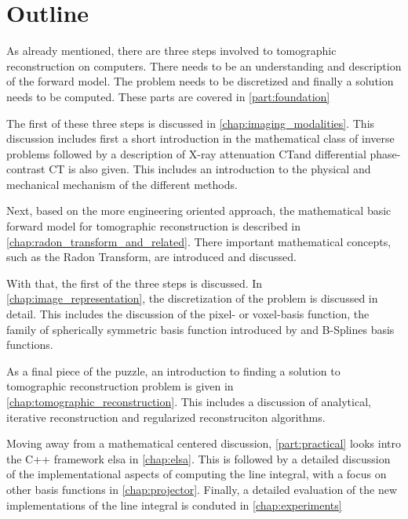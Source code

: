 
\section{Outline}\label{sec:outline}

As already mentioned, there are three steps involved to tomographic reconstruction on computers.
There needs to be an understanding and description of the forward model. The problem needs to be
discretized and finally a solution needs to be computed. These parts are covered in
\autoref{part:foundation}

The first of these three steps is discussed in \autoref{chap:imaging_modalities}. This discussion
includes first a short introduction in the mathematical class of inverse problems followed by a
description of X-ray attenuation CT\@ and differential phase-contrast CT is also given. This
includes an introduction to the physical and mechanical mechanism of the different methods.

Next, based on the more engineering oriented approach, the mathematical basic forward model for
tomographic reconstruction is described in \autoref{chap:radon_transform_and_related}. There
important mathematical concepts, such as the Radon Transform, are introduced and discussed.

With that, the first of the three steps is discussed. In \autoref{chap:image_representation}, the
discretization of the problem is discussed in detail. This includes the discussion of the pixel- or
voxel-basis function, the family of spherically symmetric basis function introduced by
\citeauthor*{lewitt_multidimensional_1990} and B-Splines basis functions.

As a final piece of the puzzle, an introduction to finding a solution to tomographic reconstruction
problem is given in \autoref{chap:tomographic_reconstruction}. This includes a discussion of
analytical, iterative reconstruction and regularized reconstruciton algorithms.

Moving away from a mathematical centered discussion, \autoref{part:practical} looks intro the C++
framework elsa in \autoref{chap:elsa}. This is followed by a detailed discussion of the
implementational aspects of computing the line integral, with a focus on other basis functions in
\autoref{chap:projector}. Finally, a detailed evaluation of the new implementations of the line
integral is conduted in \autoref{chap:experiments}

